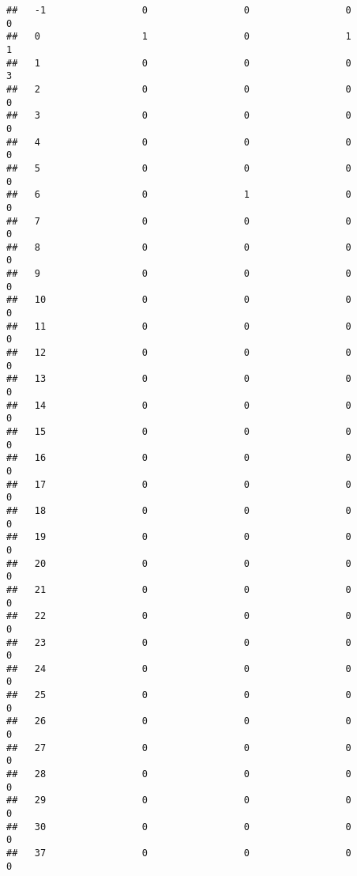 \documentclass[]{article}
\begin{document}
\begin{verbatim}
##   -1                 0                 0                 0                 0
##   0                  1                 0                 1                 1
##   1                  0                 0                 0                 3
##   2                  0                 0                 0                 0
##   3                  0                 0                 0                 0
##   4                  0                 0                 0                 0
##   5                  0                 0                 0                 0
##   6                  0                 1                 0                 0
##   7                  0                 0                 0                 0
##   8                  0                 0                 0                 0
##   9                  0                 0                 0                 0
##   10                 0                 0                 0                 0
##   11                 0                 0                 0                 0
##   12                 0                 0                 0                 0
##   13                 0                 0                 0                 0
##   14                 0                 0                 0                 0
##   15                 0                 0                 0                 0
##   16                 0                 0                 0                 0
##   17                 0                 0                 0                 0
##   18                 0                 0                 0                 0
##   19                 0                 0                 0                 0
##   20                 0                 0                 0                 0
##   21                 0                 0                 0                 0
##   22                 0                 0                 0                 0
##   23                 0                 0                 0                 0
##   24                 0                 0                 0                 0
##   25                 0                 0                 0                 0
##   26                 0                 0                 0                 0
##   27                 0                 0                 0                 0
##   28                 0                 0                 0                 0
##   29                 0                 0                 0                 0
##   30                 0                 0                 0                 0
##   37                 0                 0                 0                 0

\end{verbatim}
\end{document}

